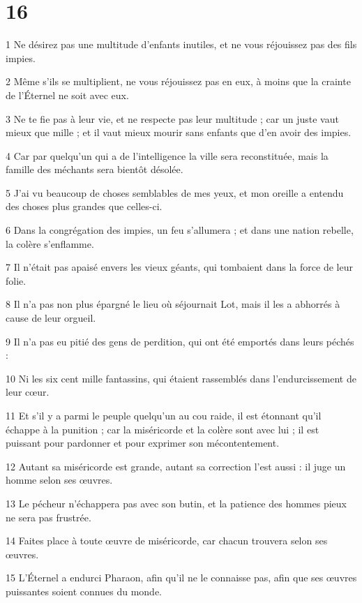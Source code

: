\chapter{16}

\par 1 Ne désirez pas une multitude d'enfants inutiles, et ne vous réjouissez pas des fils impies.
\par 2 Même s'ils se multiplient, ne vous réjouissez pas en eux, à moins que la crainte de l'Éternel ne soit avec eux.
\par 3 Ne te fie pas à leur vie, et ne respecte pas leur multitude ; car un juste vaut mieux que mille ; et il vaut mieux mourir sans enfants que d'en avoir des impies.
\par 4 Car par quelqu'un qui a de l'intelligence la ville sera reconstituée, mais la famille des méchants sera bientôt désolée.
\par 5 J'ai vu beaucoup de choses semblables de mes yeux, et mon oreille a entendu des choses plus grandes que celles-ci.
\par 6 Dans la congrégation des impies, un feu s'allumera ; et dans une nation rebelle, la colère s'enflamme.
\par 7 Il n'était pas apaisé envers les vieux géants, qui tombaient dans la force de leur folie.
\par 8 Il n'a pas non plus épargné le lieu où séjournait Lot, mais il les a abhorrés à cause de leur orgueil.
\par 9 Il n'a pas eu pitié des gens de perdition, qui ont été emportés dans leurs péchés :
\par 10 Ni les six cent mille fantassins, qui étaient rassemblés dans l'endurcissement de leur cœur.
\par 11 Et s'il y a parmi le peuple quelqu'un au cou raide, il est étonnant qu'il échappe à la punition ; car la miséricorde et la colère sont avec lui ; il est puissant pour pardonner et pour exprimer son mécontentement.
\par 12 Autant sa miséricorde est grande, autant sa correction l'est aussi : il juge un homme selon ses œuvres.
\par 13 Le pécheur n'échappera pas avec son butin, et la patience des hommes pieux ne sera pas frustrée.
\par 14 Faites place à toute œuvre de miséricorde, car chacun trouvera selon ses œuvres.
\par 15 L'Éternel a endurci Pharaon, afin qu'il ne le connaisse pas, afin que ses œuvres puissantes soient connues du monde.
